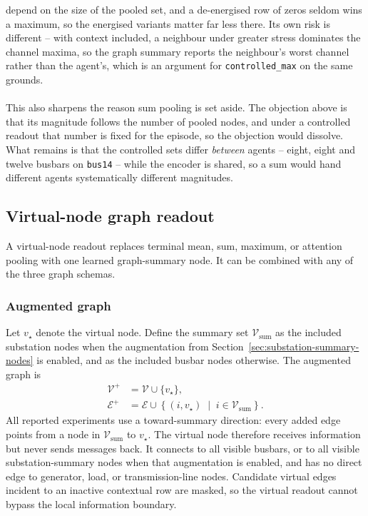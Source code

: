 {depend on the size of the pooled set, and a de-energised row of zeros seldom
wins a maximum, so the energised variants matter far less there. Its own risk is
different -- with context included, a neighbour under greater stress dominates
the channel maxima, so the graph summary reports the neighbour's worst channel
rather than the agent's, which is an argument for \texttt{controlled\_max} on the
same grounds.
\\
\\
This also sharpens the reason sum pooling is set aside. The objection above is
that its magnitude follows the number of pooled nodes, and under a controlled
readout that number is fixed for the episode, so the objection would dissolve.
What remains is that the controlled sets differ \emph{between} agents -- eight,
eight and twelve busbars on \texttt{bus14} -- while the encoder is shared, so a
sum would hand different agents systematically different magnitudes.
}

\subsection{Virtual-node graph readout}
\label{sec:virtual-node-readout}

A virtual-node readout replaces terminal mean, sum, maximum, or attention
pooling with one learned graph-summary node. It can be combined with any of the
three graph schemas.

\subsubsection{Augmented graph}
\label{subsec:virtual-node-augmented-graph}

Let $v_{\star}$ denote the virtual node. Define the summary set
$\mathcal{V}_{\mathrm{sum}}$ as the included substation nodes when the
augmentation from Section~\ref{sec:substation-summary-nodes} is enabled, and as
the included busbar nodes otherwise. The augmented graph is
\begin{align}
  \mathcal{V}^{+} &= \mathcal{V}\cup\{v_{\star}\}, \\
  \mathcal{E}^{+} &= \mathcal{E}\cup
  \left\{
    (i,v_{\star})
    \;\middle|\;
    i\in\mathcal{V}_{\mathrm{sum}}
  \right\}.
  \label{eq:virtual-node-augmentation}
\end{align}
All reported experiments use a toward-summary direction: every added edge
points from a node in $\mathcal{V}_{\mathrm{sum}}$ to $v_{\star}$. The virtual
node therefore receives information but never sends messages back. It connects
to all visible busbars, or to all visible substation-summary nodes when that
augmentation is enabled, and has no direct edge to generator, load, or
transmission-line nodes. Candidate virtual edges incident to an inactive
contextual row are masked, so the virtual readout cannot bypass the local
information boundary.

